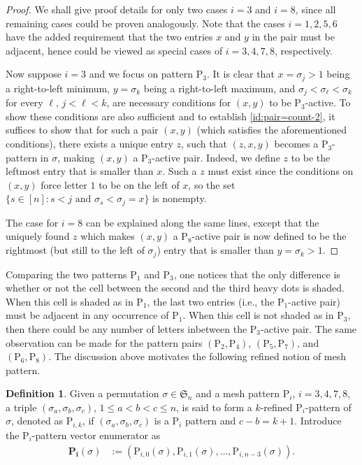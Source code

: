 \documentclass[12pt,reqno]{article}
\numberwithin{equation}{section}
\theoremstyle{plain}
\theoremstyle{definition}
\newtheorem{Def}[theorem]{Definition}
\def\fS{\mathfrak{S}}
\def\rP{\mathrm{P}}
\def\bPI{\mathbf{P_i}}
\newcommand\PGI[1]{\mathrm{P}_{i,#1}}
\begin{document}
\begin{proof}
We shall give proof details for only two cases $i=3$ and $i=8$, since all remaining cases could be proven analogously. Note that the cases $i=1,2,5,6$ have the added requirement that the two entries $x$ and $y$ in the pair must be adjacent, hence could be viewed as special cases of $i=3,4,7,8$, respectively.

Now suppose $i=3$ and we focus on pattern $\rP_3$. It is clear that $x=\sigma_j>1$ being a right-to-left minimum, $y=\sigma_k$ being a right-to-left maximum, and $\sigma_j<\sigma_\ell<\sigma_k$ for every $\ell$, $j<\ell<k$, are necessary conditions for $(x,y)$ to be $\rP_3$-active. To show these conditions are also sufficient and to establish \eqref{id:pair=count-2}, it suffices to show that for such a pair $(x,y)$ (which satisfies the aforementioned conditions), there exists a unique entry $z$, such that $(z,x,y)$ becomes a $\rP_3$-pattern in $\sigma$, making $(x,y)$ a $\rP_3$-active pair. Indeed, we define $z$ to be the leftmost entry that is smaller than $x$. Such a $z$ must exist since the conditions on $(x,y)$ force letter $1$ to be on the left of $x$, so the set $\{s\in[n]: s<j \text{ and } \sigma_s<\sigma_j=x\}$ is nonempty.

The case for $i=8$ can be explained along the same lines, except that the uniquely found $z$ which makes $(x,y)$ a $\rP_8$-active pair is now defined to be the rightmost (but still to the left of $\sigma_j$) entry that is smaller than $y=\sigma_k>1$.
\end{proof}

Comparing the two patterns $\rP_1$ and $\rP_3$, one notices that the only difference is whether or not the cell between the second and the third heavy dots is shaded. When this cell is shaded as in $\rP_1$, the last two entries (i.e., the $\rP_1$-active pair) must be adjacent in any occurrence of $\rP_1$. When this cell is not shaded as in $\rP_3$, then there could be any number of letters inbetween the $\rP_3$-active pair. The same observation can be made for the pattern pairs $(\rP_2,\rP_4)$, $(\rP_5,\rP_7)$, and $(\rP_6,\rP_8)$. The discussion above motivates the following refined notion of mesh pattern.

\begin{Def}
Given a permutation $\sigma\in\fS_n$ and a mesh pattern $\rP_i$, $i=3,4,7,8$, a triple $(\sigma_a,\sigma_b,\sigma_c)$, $1\le a < b < c \le n$, is said to form a $k$-refined $\rP_i$-pattern of $\sigma$, denoted as $\rP_{i,k}$, if $(\sigma_a,\sigma_b,\sigma_c)$ is a $\rP_i$ pattern and $c-b=k+1$. Introduce the $\rP_i$-pattern vector enumerator as
\begin{align*}
\bPI(\sigma) &:= (\PGI{0}(\sigma),\PGI{1}(\sigma),\ldots,\PGI{n-3}(\sigma)).
\end{align*}
\end{Def}
\end{document}
